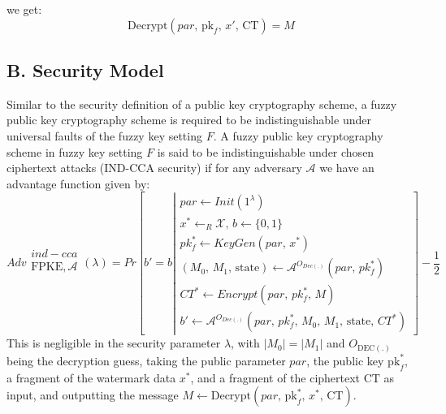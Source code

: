 \documentclass[graybox]{svmult}
\begin{document}
we get:
\begin{equation}
    \text{Decrypt}(par ,\, \text{pk}_f,\, x',\, \text{CT}) = M
\end{equation}

\subsection*{B. Security Model}

Similar to the security definition of a public key cryptography scheme, a fuzzy public key cryptography scheme is required to be indistinguishable under universal faults of the fuzzy key setting \( F \).
A fuzzy public key cryptography scheme in fuzzy key setting \( F \) is said to be indistinguishable under chosen ciphertext attacks (IND-CCA security) if for any adversary \( \mathcal{A} \) we have an advantage function given by:
{
\small
\begin{equation}
    Adv\begin{array}{c}
        ind-cca                  \\
        \text{FPKE}, \mathcal{A} \\
    \end{array} (\lambda)
    =
    Pr\left[b'= b \left| \begin{array}{c}
            par  \leftarrow Init(1^\lambda)                                                         \\
            x^* \leftarrow_{R} \mathcal{X}, \, b \leftarrow \{0, 1 \}                               \\
            pk^*_f \leftarrow KeyGen(par , \, x^*)                                                  \\

            (M_{0}, \, M_{1}, \, \text{state}) \leftarrow \mathcal{A}^{O_{Dec(.)}}(par , \, pk^*_f) \\
            CT^* \leftarrow Encrypt(par , \, pk^*_f, \, M)                                          \\
            b' \leftarrow \mathcal{A}^{O_{Dec(.)}}(par  , \, pk^*_f, \, M_0, \, M_1, \, \text{state}, \, CT^*)
        \end{array} \right. \right] - \frac{1}{2}
\end{equation}
}
This is negligible in the security parameter \( \lambda \), with \( |M_0| = |M_1| \) and \( O_{\text{DEC}(.)} \) being the decryption guess, taking the public parameter \(  par \), the public key \( \text{pk}_f^* \), a fragment of the watermark data \( x^* \), and a fragment of the ciphertext \( \text{CT} \) as input, and outputting the message \( M \leftarrow \text{Decrypt}(par ,\, \text{pk}_f^*,\, x^*,\, \text{CT}) \).
\end{document}

